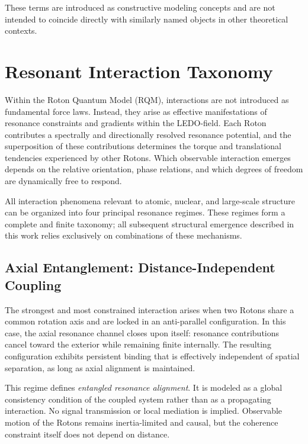 \documentclass[11pt,a4paper]{article}
\begin{document}
These terms are introduced as constructive modeling concepts and are not intended to
coincide directly with similarly named objects in other theoretical contexts.



\section{Resonant Interaction Taxonomy}
\label{sec:interaction_taxonomy}

Within the Roton Quantum Model (RQM), interactions are not introduced as fundamental force laws.
Instead, they arise as effective manifestations of resonance constraints and gradients within the
LEDO-field.
Each Roton contributes a spectrally and directionally resolved resonance potential, and the
superposition of these contributions determines the torque and translational tendencies experienced
by other Rotons.
Which observable interaction emerges depends on the relative orientation, phase relations, and
which degrees of freedom are dynamically free to respond.

All interaction phenomena relevant to atomic, nuclear, and large-scale structure can be organized
into four principal resonance regimes.
These regimes form a complete and finite taxonomy; all subsequent structural emergence described
in this work relies exclusively on combinations of these mechanisms.

\subsection{Axial Entanglement: Distance-Independent Coupling}

The strongest and most constrained interaction arises when two Rotons share a common rotation axis
and are locked in an anti-parallel configuration.
In this case, the axial resonance channel closes upon itself: resonance contributions cancel toward
the exterior while remaining finite internally.
The resulting configuration exhibits persistent binding that is effectively independent of spatial
separation, as long as axial alignment is maintained.

This regime defines \emph{entangled resonance alignment}.
It is modeled as a global consistency condition of the coupled system rather than as a propagating
interaction.
No signal transmission or local mediation is implied.
Observable motion of the Rotons remains inertia-limited and causal, but the coherence constraint
itself does not depend on distance.
\end{document}
